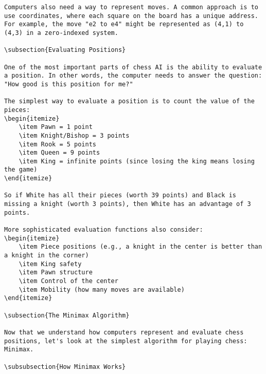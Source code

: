 \documentclass[11pt]{article}
\begin{document}
\begin{lstlisting}[style=Python]
Computers also need a way to represent moves. A common approach is to use coordinates, where each square on the board has a unique address. For example, the move "e2 to e4" might be represented as (4,1) to (4,3) in a zero-indexed system.

\subsection{Evaluating Positions}

One of the most important parts of chess AI is the ability to evaluate a position. In other words, the computer needs to answer the question: "How good is this position for me?"

The simplest way to evaluate a position is to count the value of the pieces:
\begin{itemize}
    \item Pawn = 1 point
    \item Knight/Bishop = 3 points
    \item Rook = 5 points
    \item Queen = 9 points
    \item King = infinite points (since losing the king means losing the game)
\end{itemize}

So if White has all their pieces (worth 39 points) and Black is missing a knight (worth 3 points), then White has an advantage of 3 points.

More sophisticated evaluation functions also consider:
\begin{itemize}
    \item Piece positions (e.g., a knight in the center is better than a knight in the corner)
    \item King safety
    \item Pawn structure
    \item Control of the center
    \item Mobility (how many moves are available)
\end{itemize}

\subsection{The Minimax Algorithm}

Now that we understand how computers represent and evaluate chess positions, let's look at the simplest algorithm for playing chess: Minimax.

\subsubsection{How Minimax Works}


\end{lstlisting}
\end{document}
